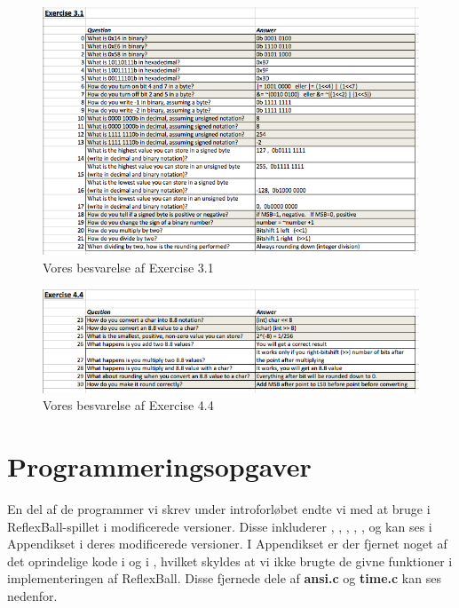\begin{figure}[h!]
\centering
\includegraphics[scale=0.6]{figs/Ex3.png}
\caption{Vores besvarelse af Exercise 3.1}
\label{fig:Ex3.1}
\end{figure}

\begin{figure}[h!]
\centering
\includegraphics[scale=0.6]{figs/Ex4.png}
\caption{Vores besvarelse af Exercise 4.4}
\label{fig:Ex4.4}
\end{figure}

\newpage

\section{Programmeringsopgaver}
En del af de programmer vi skrev under introforløbet endte vi med at bruge i ReflexBall-spillet i modificerede versioner. Disse inkluderer , , , , ,  og  kan ses i Appendikset \textbf{} i deres modificerede versioner. I Appendikset \textbf{} er der fjernet noget af det oprindelige kode i  og i , hvilket skyldes at vi ikke brugte de givne funktioner i implementeringen af ReflexBall. Disse fjernede dele af \textbf{ansi.c} og \textbf{time.c} kan ses nedenfor.
\newpage

